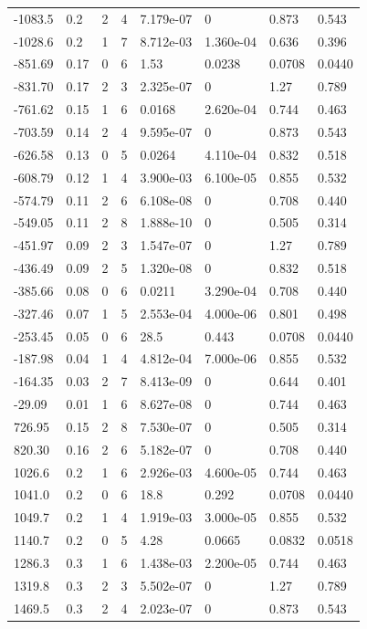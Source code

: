 \documentclass[preview]{standalone}
\begin{document}
{{\begin{tabular}{L{1.2cm}C{1.2cm} C{0.3cm}C{0.5cm} C{1.4cm}C{1.4cm} C{1.4cm}C{1.4cm}}
  -1083.5  &   0.2  & 2     &  4 &  7.179e-07  & 0  & 0.873 &  0.543   \\ 
  -1028.6  &   0.2  & 1     &  7 &  8.712e-03  & 1.360e-04  & 0.636 &  0.396   \\ 
  -851.69  &  0.17  & 0     &  6 &  1.53  & 0.0238  & 0.0708 &  0.0440   \\ 
  -831.70  &  0.17  & 2     &  3 &  2.325e-07  & 0  & 1.27 &  0.789   \\ 
  -761.62  &  0.15  & 1     &  6 &  0.0168  & 2.620e-04  & 0.744 &  0.463   \\ 
  -703.59  &  0.14  & 2     &  4 &  9.595e-07  & 0  & 0.873 &  0.543   \\ 
  -626.58  &  0.13  & 0     &  5 &  0.0264  & 4.110e-04  & 0.832 &  0.518   \\ 
  -608.79  &  0.12  & 1     &  4 &  3.900e-03  & 6.100e-05  & 0.855 &  0.532   \\ 
  -574.79  &  0.11  & 2     &  6 &  6.108e-08  & 0  & 0.708 &  0.440   \\ 
  -549.05  &  0.11  & 2     &  8 &  1.888e-10  & 0  & 0.505 &  0.314   \\ 
  -451.97  &  0.09  & 2     &  3 &  1.547e-07  & 0  & 1.27 &  0.789   \\ 
  -436.49  &  0.09  & 2     &  5 &  1.320e-08  & 0  & 0.832 &  0.518   \\ 
  -385.66  &  0.08  & 0     &  6 &  0.0211  & 3.290e-04  & 0.708 &  0.440   \\ 
  -327.46  &  0.07  & 1     &  5 &  2.553e-04  & 4.000e-06  & 0.801 &  0.498   \\ 
  -253.45  &  0.05  & 0     &  6 &  28.5  & 0.443  & 0.0708 &  0.0440   \\ 
  -187.98  &  0.04  & 1     &  4 &  4.812e-04  & 7.000e-06  & 0.855 &  0.532   \\ 
  -164.35  &  0.03  & 2     &  7 &  8.413e-09  & 0  & 0.644 &  0.401   \\ 
  -29.09  &  0.01  & 1     &  6 &  8.627e-08  & 0  & 0.744 &  0.463   \\ 
  726.95  &  0.15  & 2     &  8 &  7.530e-07  & 0  & 0.505 &  0.314   \\ 
  820.30  &  0.16  & 2     &  6 &  5.182e-07  & 0  & 0.708 &  0.440   \\ 
  1026.6  &   0.2  & 1     &  6 &  2.926e-03  & 4.600e-05  & 0.744 &  0.463   \\ 
  1041.0  &   0.2  & 0     &  6 &  18.8  & 0.292  & 0.0708 &  0.0440   \\ 
  1049.7  &   0.2  & 1     &  4 &  1.919e-03  & 3.000e-05  & 0.855 &  0.532   \\ 
  1140.7  &   0.2  & 0     &  5 &  4.28  & 0.0665  & 0.0832 &  0.0518   \\ 
  1286.3  &   0.3  & 1     &  6 &  1.438e-03  & 2.200e-05  & 0.744 &  0.463   \\ 
  1319.8  &   0.3  & 2     &  3 &  5.502e-07  & 0  & 1.27 &  0.789   \\ 
  1469.5  &   0.3  & 2     &  4 &  2.023e-07  & 0  & 0.873 &  0.543   \\ 
\hline 
\end{tabular} 

}}
\end{document}

